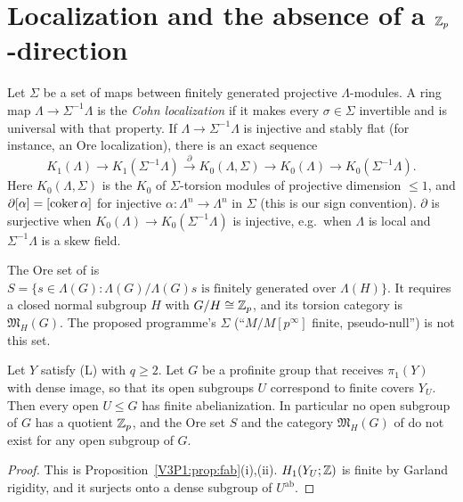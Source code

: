 \section{Localization and the absence of a \texorpdfstring{$\Z_p$}{Zp}-direction}\label{V3P6:sec:loc}

\begin{definition}\label{V3P6:def:cohn}
Let $\Sigma$ be a set of maps between finitely generated projective $\Lambda$-modules. A ring
map $\Lambda\to\Sigma^{-1}\Lambda$ is the \emph{Cohn localization} if it makes every
$\sigma\in\Sigma$ invertible and is universal with that property. If $\Lambda\to\Sigma^{-1}\Lambda$
is injective and stably flat (for instance, an Ore localization), there is an exact sequence
\cite{NR04}
\[
K_1(\Lambda)\to K_1(\Sigma^{-1}\Lambda)\xrightarrow{\ \partial\ }K_0(\Lambda,\Sigma)\to
K_0(\Lambda)\to K_0(\Sigma^{-1}\Lambda).
\]
Here $K_0(\Lambda,\Sigma)$ is the $K_0$ of $\Sigma$-torsion modules of projective dimension
$\le1$, and $\partial[\alpha]=[\operatorname{coker}\alpha]$ for injective $\alpha\colon\Lambda^{n}\to\Lambda^{n}$
in $\Sigma$ (this is our sign convention). $\partial$ is surjective when $K_0(\Lambda)\to
K_0(\Sigma^{-1}\Lambda)$ is injective, e.g.\ when $\Lambda$ is local and $\Sigma^{-1}\Lambda$
is a skew field.
\end{definition}

The Ore set of \cite{CFKSV} is
$S=\{s\in\Lambda(G):\Lambda(G)/\Lambda(G)s\text{ is finitely generated over }\Lambda(H)\}$.
It requires a closed normal subgroup $H$ with $G/H\cong\mathbb{Z}_p$, and its torsion category is
$\mathfrak M_H(G)$. The proposed programme's $\Sigma$ (``$M/M[p^{\infty}]$ finite, pseudo-null'') is not
this set.

\begin{theorem}[No $\Z_p$-direction]\label{V3P6:thm:nozp}
Let $Y$ satisfy \textup{(L)} with $q\ge2$. Let $G$ be a profinite group that receives
$\pi_1(Y)$ with dense image, so that its open subgroups $U$ correspond to finite covers $Y_U$.
Then every open $U\le G$ has finite abelianization. In particular no open subgroup of $G$ has a
quotient $\Z_p$, and the Ore set $S$ and the category $\mathfrak M_H(G)$ of \cite{CFKSV} do not
exist for any open subgroup of $G$.
\end{theorem}

\begin{proof}
This is Proposition~\ref{V3P1:prop:fab}(i),(ii). $H_1(Y_U;\mathbb{Z})$ is finite by Garland rigidity,
and it surjects onto a dense subgroup of $U^{\mathrm{ab}}$.
\end{proof}

